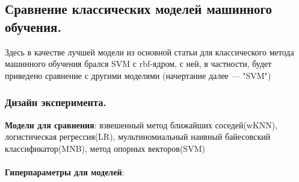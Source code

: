 \documentclass{article}
\begin{document}
\subsection{Сравнение классических моделей машинного обучения.}
Здесь в качестве лучшей модели из основной статьи для классического метода машинного обучения брался SVM с rbf-ядром, с ней, в частности, будет приведено сравнение с другими моделями (начертание далее --- "SVM")
\subsubsection{Дизайн эксперимента.}

{\bfseries Модели для сравнения}: взвешенный метод ближайших соседей(wKNN), логистическая регрессия(LR), мультиномиальный наивный байесовский классификатор(MNB), метод опорных векторов(SVM) \\ 
\\
{\bfseries Гиперпараметры для моделей}:
\\ 
\end{document}
